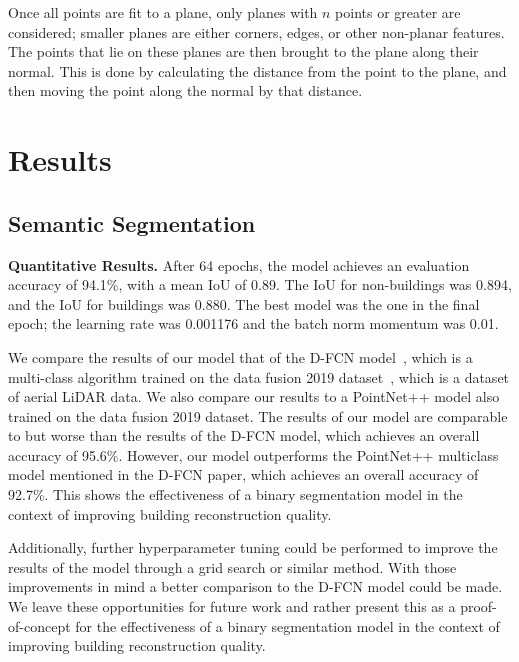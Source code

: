\documentclass[10pt,twocolumn,letterpaper]{article}
\begin{document}
    Once all points are fit to a plane, only planes with $n$ points or greater are considered; smaller planes are either corners, edges, or other non-planar features.
    The points that lie on these planes are then brought to the plane along their normal.
    This is done by calculating the distance from the point to the plane, and then moving the point along the normal by that distance.

    \section{Results}\label{sec:results}

    \subsection{Semantic Segmentation}\label{subsection:semantic-segmentation-results}
    \textbf{Quantitative Results.} After 64 epochs, the model achieves an evaluation accuracy of 94.1\%, with a mean IoU of 0.89. The IoU for non-buildings was 0.894, and the IoU for buildings was 0.880.
    The best model was the one in the final epoch; the learning rate was 0.001176 and the batch norm momentum was 0.01.

    We compare the results of our model that of the D-FCN model~\cite{dfcn}, which is a multi-class algorithm trained on the data fusion 2019 dataset~\cite{2019DataFusionContest}, which is a dataset of aerial LiDAR data.
    We also compare our results to a PointNet++ model also trained on the data fusion 2019 dataset.
    The results of our model are comparable to but worse than the results of the D-FCN model, which achieves an overall accuracy of 95.6\%.
    However, our model outperforms the PointNet++ multiclass model mentioned in the D-FCN paper, which achieves an overall accuracy of 92.7\%.
    This shows the effectiveness of a binary segmentation model in the context of improving building reconstruction quality.

    Additionally, further hyperparameter tuning could be performed to improve the results of the model through a grid search or similar method.
    With those improvements in mind a better comparison to the D-FCN model could be made.
    We leave these opportunities for future work and rather present this as a proof-of-concept for the effectiveness of a binary segmentation model in the context of improving building reconstruction quality.
\end{document}
